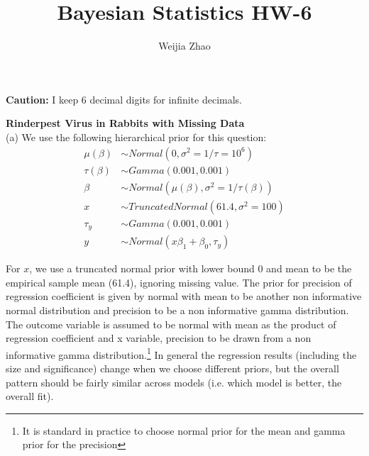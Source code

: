 \documentclass{homeworg}
\title{Bayesian Statistics HW-6}
\author{Weijia Zhao}
\begin{document}
\maketitle

\textbf{Caution:} I keep 6 decimal digits for infinite decimals.

\exercise 
\textbf{Rinderpest Virus in Rabbits with Missing Data} \\
(a) We use the following hierarchical prior for this question:
\begin{align*}
\mu(\beta) & \sim Normal(0,\sigma^2=1/\tau=10^6) \\
\tau(\beta) & \sim Gamma(0.001,0.001) \\
\beta & \sim Normal(\mu(\beta),\sigma^2=1/\tau(\beta)) \\
x & \sim TruncatedNormal(61.4,\sigma^2=100) \\
\tau_y & \sim Gamma(0.001,0.001) \\
y & \sim  Normal(x\beta_1+\beta_0,\tau_y)
\end{align*}

For $x$, we use a truncated normal prior with lower bound 0 and mean to be the empirical sample mean (61.4), ignoring missing value. The prior for precision of regression coefficient is given by normal with mean to be another non informative normal distribution and precision to be a non informative gamma distribution. The outcome variable is assumed to be normal with mean as the product of regression coefficient and x variable, precision to be drawn from a non informative gamma distribution.\footnote{It is standard in practice to choose normal prior for the mean and gamma prior for the precision} In general the regression results (including the size and significance) change when we choose different priors, but the overall pattern should be fairly similar across models (i.e. which model is better, the overall fit).
\end{document}
